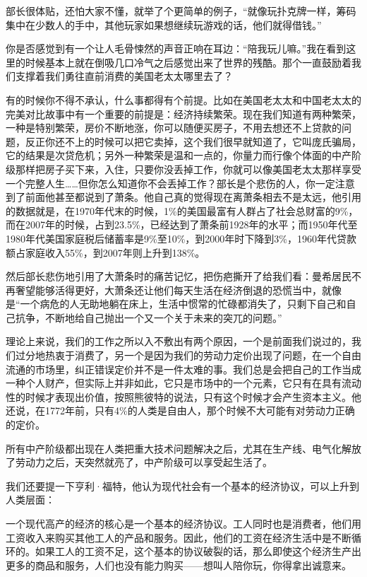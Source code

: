 部长很体贴，还怕大家不懂，就举了个更简单的例子，``就像玩扑克牌一样，筹码集中在少数人的手中，其他玩家如果想继续玩游戏的话，他们就得借钱。''

你是否感觉到有一个让人毛骨悚然的声音正响在耳边：``陪我玩儿嘛。''我在看到这里的时候基本上就在倒吸几口冷气之后感觉出来了世界的残酷。那个一直鼓励着我们支撑着我们勇往直前消费的美国老太太哪里去了？

有的时候你不得不承认，什么事都得有个前提。比如在美国老太太和中国老太太的完美对比故事中有一个重要的前提是：经济持续繁荣。现在我们知道有两种繁荣，一种是特别繁荣，房价不断地涨，你可以随便买房子，不用去想还不上贷款的问题，反正你还不上的时候可以把它卖掉，这个我们很早就知道了，它叫庞氏骗局，它的结果是次贷危机；另外一种繁荣是温和一点的，你量力而行像个体面的中产阶级那样把房子买下来，入住，只要你没丢掉工作，你就可以像美国老太太那样享受一个完整人生\ldots{}\ldots{}但你怎么知道你不会丢掉工作？部长是个悲伤的人，你一定注意到了前面他甚至都说到了萧条。他自己真的觉得现在离萧条相去不是太远，他引用的数据就是，在1970年代末的时候，1\%的美国最富有人群占了社会总财富的9\%，而在2007年的时候，占到23.5\%，已经达到了萧条前1928年的水平；而1950年代至1980年代美国家庭税后储蓄率是9\%至10\%，到2000年时下降到3\%，1960年代贷款额占家庭收入55\%，到2007年则上升到138\%。

然后部长悲伤地引用了大萧条时的痛苦记忆，把伤疤撕开了给我们看：曼希居民不再奢望能够活得更好，大萧条还让他们每天生活在经济倒退的恐慌当中，就像是``一个病危的人无助地躺在床上，生活中惯常的忙碌都消失了，只剩下自己和自己抗争，不断地给自己抛出一个又一个关于未来的突兀的问题。''

理论上来说，我们的工作之所以入不敷出有两个原因，一个是前面我们说过的，我们过分地热衷于消费了，另一个是因为我们的劳动力定价出现了问题，在一个自由流通的市场里，纠正错误定价并不是一件太难的事。我们总是会把自己的工作当成一种个人财产，但实际上并非如此，它只是市场中的一个元素，它只有在具有流动性的时候才表现出价值，按照熊彼特的说法，只有这个时候才会产生资本主义。他还说，在1772年前，只有4\%的人类是自由人，那个时候不大可能有对劳动力正确的定价。

所有中产阶级都出现在人类把重大技术问题解决之后，尤其在生产线、电气化解放了劳动力之后，天突然就亮了，中产阶级可以享受起生活了。

我们还要提一下亨利·福特，他认为现代社会有一个基本的经济协议，可以上升到人类层面：

一个现代高产的经济的核心是一个基本的经济协议。工人同时也是消费者，他们用工资收入来购买其他工人的产品和服务。因此，他们的工资在经济生活中是不断循环的。如果工人的工资不足，这个基本的协议破裂的话，那么即使这个经济生产出更多的商品和服务，人们也没有能力购买------想叫人陪你玩，你得拿出诚意来。

